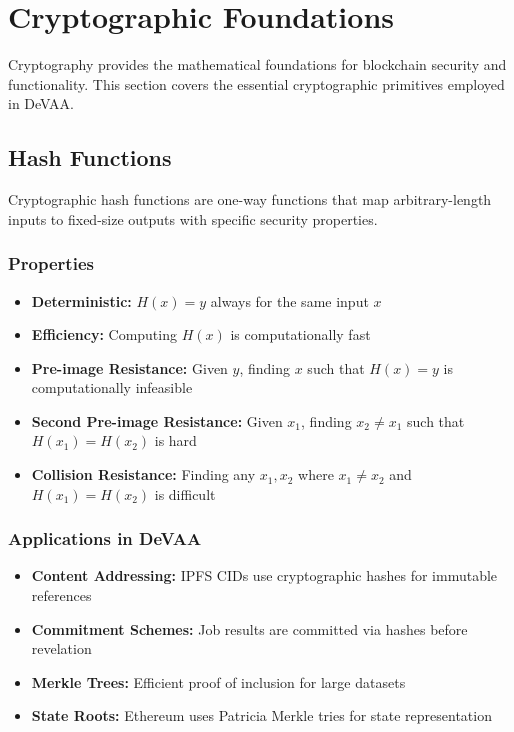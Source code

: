 \section{Cryptographic Foundations}

Cryptography provides the mathematical foundations for blockchain security and functionality. This section covers the essential cryptographic primitives employed in DeVAA.

\subsection{Hash Functions}

Cryptographic hash functions are one-way functions that map arbitrary-length inputs to fixed-size outputs with specific security properties.

\subsubsection{Properties}
\begin{itemize}
    \item \textbf{Deterministic:} $H(x) = y$ always for the same input $x$
    \item \textbf{Efficiency:} Computing $H(x)$ is computationally fast
    \item \textbf{Pre-image Resistance:} Given $y$, finding $x$ such that $H(x) = y$ is computationally infeasible
    \item \textbf{Second Pre-image Resistance:} Given $x_1$, finding $x_2 \neq x_1$ such that $H(x_1) = H(x_2)$ is hard
    \item \textbf{Collision Resistance:} Finding any $x_1, x_2$ where $x_1 \neq x_2$ and $H(x_1) = H(x_2)$ is difficult
\end{itemize}

\subsubsection{Applications in DeVAA}
\begin{itemize}
    \item \textbf{Content Addressing:} IPFS CIDs use cryptographic hashes for immutable references
    \item \textbf{Commitment Schemes:} Job results are committed via hashes before revelation
    \item \textbf{Merkle Trees:} Efficient proof of inclusion for large datasets
    \item \textbf{State Roots:} Ethereum uses Patricia Merkle tries for state representation
\end{itemize}

